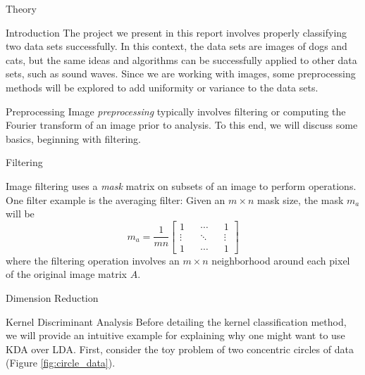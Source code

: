 \begin{section}{Theory}

\begin{subsection}{Introduction}
The project we present in this report involves properly classifying two data sets successfully. In this context, the data sets are images of dogs and cats, but the same ideas and algorithms can be successfully applied to other data sets, such as sound waves. Since we are working with images, some preprocessing methods will be explored to add uniformity or variance to the data sets. 
\end{subsection}

\begin{subsection}{Preprocessing}
Image \textit{preprocessing} typically involves filtering or computing the Fourier transform of an image prior to analysis. To this end, we will discuss some basics, beginning with filtering. 

\begin{subsubsection}{Filtering}

Image filtering uses a \textit{mask} matrix on subsets of an image to perform operations. One filter example is the averaging filter: Given an $m \times n$ mask size, the mask $m_a$will be
$$
	m_a = \frac{1}{mn} \begin{bmatrix} 1 && \cdots && 1 \\ \vdots && \ddots && \vdots \\ 1 && \cdots && 1 \end{bmatrix}
$$
where the filtering operation involves an $m\times n$ neighborhood around each pixel of the original image matrix $A$.
\end{subsubsection}

\begin{subsubsection}{Dimension Reduction}
\end{subsubsection}

\end{subsection}

\begin{subsection}{Kernel Discriminant Analysis}
Before detailing the kernel classification method, we will provide an intuitive example for explaining why one might want to use KDA over LDA. First, consider the toy problem of two concentric circles of data (Figure \ref{fig:circle_data}).


\end{subsection}
\end{section}
